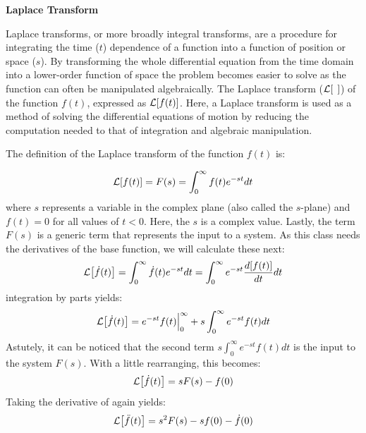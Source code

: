 \documentclass[12pt,letter]{article}
\begin{document}
\begin{review}

	\label{sec:Laplace_review}
	
	\textbf{Laplace Transform}
	
	\noindent Laplace transforms, or more broadly integral transforms, are a procedure for integrating the time ($t$) dependence of a function into a function of position or space ($s$). By transforming the whole differential equation from the time domain into a lower-order function of space the problem becomes easier to solve as the function can often be manipulated algebraically. The Laplace transform ($\mathcal{L}{\left[\hspace{1ex}\right]}$) of the function $f(t)$, expressed as $\mathcal{L}{\left[f(t)\right]}$. Here, a Laplace transform is used as a method of solving the differential equations of motion by reducing the computation needed to that of integration and algebraic manipulation. 
	
	The definition of the Laplace transform of the function $f(t)$ is:
	
	\begin{equation}
		\mathcal{L}{\left[f(t)\right]} = F(s) = \int_{0}^{\infty} f(t)e^{-st}dt
	\end{equation}
	where $s$ represents a variable in the complex plane (also called the $s$-plane) and $f(t)=0$ for all values of $t<0$. Here, the $s$ is a complex value. Lastly, the term $F(s)$ is a generic term that represents the input to a system. As this class needs the derivatives of the base function, we will calculate these next:
	\begin{equation}
		\mathcal{L}{\left[\dot{f}(t)\right]} = \int_{0}^{\infty} \dot{f}(t)e^{-st}dt = \int_{0}^{\infty} e^{-st}\frac{d[f(t)]}{dt}dt 
	\end{equation}		
	integration by parts yields:
	\begin{equation}
		\mathcal{L}{\left[\dot{f}(t)\right]} = e^{-st}f(t)\Big|_0^\infty+s\int_{0}^{\infty}e^{-st}f(t)dt
	\end{equation}
	Astutely, it can be noticed that the second term $s\int_{0}^{\infty}e^{-st}f(t)dt$
	is the input to the system $F(s)$. With a little rearranging, this becomes:
	\begin{equation}
		\mathcal{L}{\left[\dot{f}(t)\right]} = sF(s)-f(0)
	\end{equation}
	Taking the derivative of again yields:
	\begin{equation}
		\mathcal{L}{\left[\ddot{f}(t)\right]} = s^2F(s)-sf(0)-\dot{f}(0)
	\end{equation}
	

\end{review}
\end{document}
